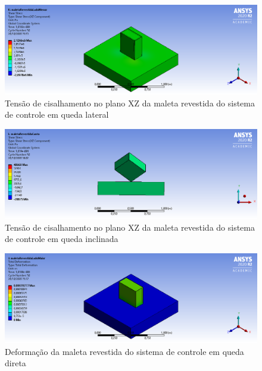 \begin{apendicesenv}
\begin{figure}[htb]
    \centering
    \includegraphics[width=1.0\textwidth, angle=0]{figuras/estrutura_simulacaoImpacto/maletaRevestidaCisalhamentoXZMenor.png}
    \caption{Tensão de cisalhamento no plano XZ da maleta revestida do sistema de controle em queda lateral}
    \label{fig:simulacaoImpacto_32}
\end{figure}

\begin{figure}[htb]
    \centering
    \includegraphics[width=1.0\textwidth, angle=0]{figuras/estrutura_simulacaoImpacto/maletaRevestidaCisalhamentoXZCanto.png}
    \caption{Tensão de cisalhamento no plano XZ da maleta revestida do sistema de controle em queda inclinada}
    \label{fig:simulacaoImpacto_33}
\end{figure}

\begin{figure}[htb]
    \centering
    \includegraphics[width=1.0\textwidth, angle=0]{figuras/estrutura_simulacaoImpacto/maletaRevestidaDeformationMaior.png}
    \caption{Deformação da maleta revestida do sistema de controle em queda direta}
    \label{fig:simulacaoImpacto_34}
\end{figure}


\end{apendicesenv}

